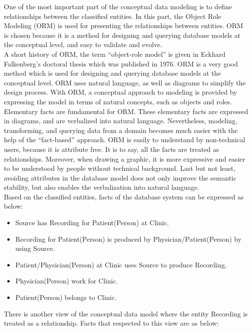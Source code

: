 One of the most important part of the conceptual data modeling is to define relationships between the classified entities. In this part, the Object Role Modeling (ORM) is used for presenting the relationships between entities. ORM is chosen because it is a method for designing and querying database models at the conceptual level, and easy to validate and evolve\citep{ORMdotNET}.\\
A short history of ORM, the term “object-role model” is given in Eckhard Falkenberg’s doctoral thesis which was published in 1976\citep{Wiki_ORM}. ORM is a very good method which is used for designing and querying database models at the conceptual level. ORM uses natural language, as well as diagrams to simplify the design process. With ORM, a conceptual approach to modeling is provided by expressing the model in terms of natural concepts, such as objects and roles. Elementary facts are fundamental for ORM. These elementary facts are expressed in diagrams, and are verbalized into natural language. Nevertheless, modeling, transforming, and querying data from a domain becomes much easier with the help of the “fact-based” approach. ORM is easily to understand by non-technical users, because it is attribute free. It is to say, all the facts are treated as relationships. Moreover, when drawing a graphic, it is more expressive and easier to be understood by people without technical background. Last but not least, avoiding attributes in the database model does not only improve the semantic stability, but also enables the verbalization into natural language.\\
Based on the classified entities, facts of the database system can be expressed as below:
\begin{itemize}
\item Source has Recording for Patient(Person) at Clinic.\\
\item Recording for Patient(Person) is produced by Physician/Patient(Person) by using Source.\\
\item Patient/Physician(Person) at Clinic uses Source to produce Recording.\\
\item Physician(Person) work for Clinic.\\
\item Patient(Person) belongs to Clinic.
\end{itemize}
There is another view of the conceptual data model where the entity Recording is treated as a relationship. Facts that respected to this view are as below:
